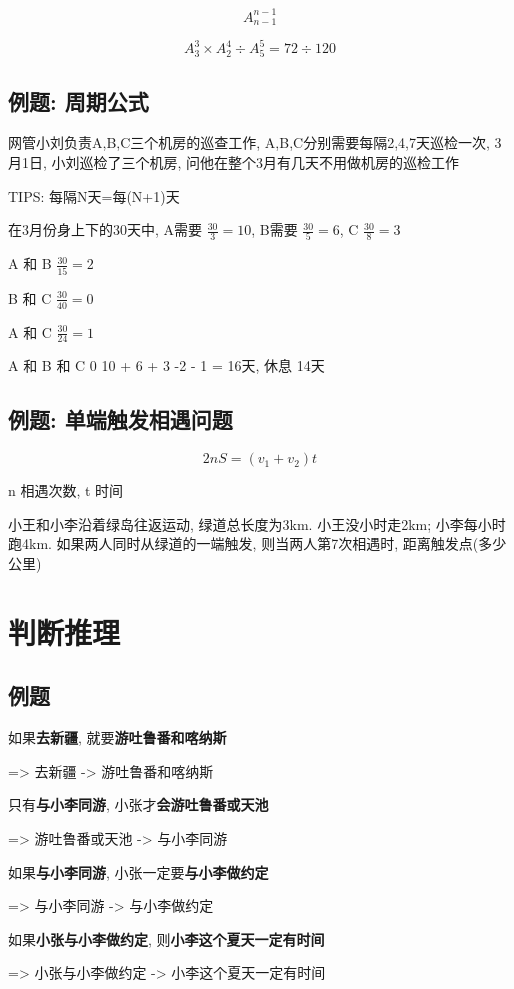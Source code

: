 \documentclass[UTF8]{ctexart}
\begin{document}
$$
	A^{n-1}_{n-1}
$$

$$
	A^{3}_{3} \times A^{4}_{2} \div A^{5}_{5} = 72 \div 120
$$

\subsection{例题: 周期公式}
网管小刘负责A,B,C三个机房的巡查工作, A,B,C分别需要每隔2,4,7天巡检一次, 3月1日, 小刘巡检了三个机房, 问他在整个3月有几天不用做机房的巡检工作

TIPS: 每隔N天=每(N+1)天

在3月份身上下的30天中, A需要  $\frac{30}{3} = 10$, B需要 $\frac{30}{5} = 6$, C $\frac{30}{8} = 3$

A 和 B $\frac{30}{15} = 2$

B 和 C $\frac{30}{40} = 0$

A 和 C $\frac{30}{24} = 1$

A 和 B 和 C 0
10 + 6 + 3 -2 - 1 = 16天, 休息 14天


\subsection{例题: 单端触发相遇问题}

$$
	2nS = (v_1 + v_2) t
$$

n 相遇次数, t 时间

小王和小李沿着绿岛往返运动, 绿道总长度为3km. 小王没小时走2km; 小李每小时跑4km. 如果两人同时从绿道的一端触发, 则当两人第7次相遇时, 距离触发点(多少公里)

\section{判断推理}

\subsection{例题}
如果\textbf{去新疆}, 就要\textbf{游吐鲁番和喀纳斯}

=> 去新疆 -> 游吐鲁番和喀纳斯

只有\textbf{与小李同游}, 小张才\textbf{会游吐鲁番或天池}

=> 游吐鲁番或天池 -> 与小李同游

如果\textbf{与小李同游}, 小张一定要\textbf{与小李做约定}

=> 与小李同游 -> 与小李做约定

如果\textbf{小张与小李做约定}, 则\textbf{小李这个夏天一定有时间}

=> 小张与小李做约定 -> 小李这个夏天一定有时间
\end{document}
